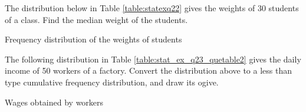 %
%
\item The distribution below in Table \ref{table:statexq22} gives the weights of 30 students of a class. Find the median
weight of the students.
\begin{table}[ht]
	\begin{center}
    	
	\caption{Frequency distribution of the weights of students}
	\label{table:statexq22}
	\end{center}
	\end{table}
\solution

\item The following distribution in Table \ref{table:stat_ex_q23_quetable2} gives the daily income of 50 workers of a factory.
Convert the distribution above to a less than type cumulative frequency distribution,
and draw its ogive.
	\begin{table}[ht]
\centering
    	
	\caption{Wages obtained by workers}
	\label{table:stat_ex_q23_quetable2}
	\end{table}
\\
\solution
